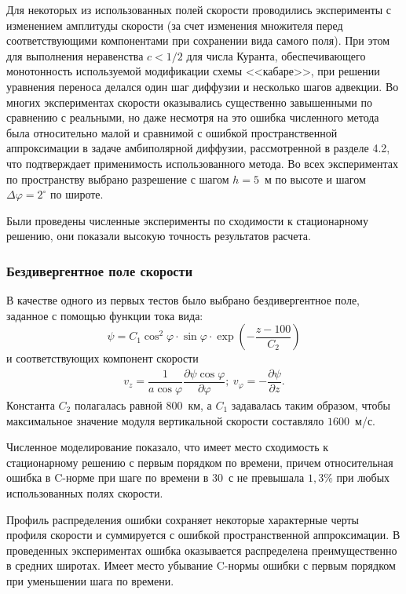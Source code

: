 \documentclass[14pt, a4paper]{extarticle}
\begin{document}
Для некоторых из использованных полей скорости проводились эксперименты с изменением амплитуды скорости (за счет изменения множителя перед соответствующими компонентами при сохранении вида самого поля). При этом для выполнения неравенства $c < 1/2$ для числа Куранта, обеспечивающего монотонность используемой модификации схемы <<кабаре>>, при решении уравнения переноса делался один шаг диффузии и несколько шагов адвекции. Во многих экспериментах скорости оказывались существенно завышенными по сравнению с реальными, но даже несмотря на это ошибка численного метода была относительно малой и сравнимой с ошибкой пространственной аппроксимации в задаче амбиполярной диффузии, рассмотренной в разделе 4.2, что подтверждает применимость использованного метода. Во всех экспериментах по пространству выбрано разрешение с шагом $h = 5$~м по высоте и шагом $\Delta \varphi = 2^\circ$ по широте.

Были проведены численные эксперименты по сходимости к стационарному решению, они показали высокую точность результатов расчета.

\subsubsection{Бездивергентное поле скорости}

В качестве одного из первых тестов было выбрано бездивергентное поле, заданное с помощью функции тока вида:
\begin{equation}\label{nondiv_field}
\psi = C_1 \cos^2 \varphi \cdot \sin \varphi \cdot \exp\left(-\dfrac{z-100}{C_2}\right)
\end{equation}
и соответствующих компонент скорости 
\begin{gather}
v_z = \dfrac{1}{a\cos\varphi} \dfrac{\partial \psi\cos\varphi}{\partial \varphi}; \ v_\varphi = -\dfrac{\partial \psi}{\partial z}.
\end{gather}
Константа $C_2$ полагалась равной $800$~км, а $C_1$ задавалась таким образом, чтобы максимальное значение модуля вертикальной скорости составляло $1600$~м/с.

Численное моделирование показало, что имеет место сходимость к стационарному решению с первым порядком по времени, причем относительная ошибка в C-норме при шаге по времени в $30$~с не превышала $1{,}3\%$ при любых использованных полях скорости. 

Профиль распределения ошибки сохраняет некоторые характерные черты профиля скорости и суммируется с ошибкой пространственной аппроксимации. В проведенных экспериментах ошибка оказывается распределена преимущественно в средних широтах. Имеет место убывание C-нормы ошибки с первым порядком при уменьшении шага по времени. 
\end{document}
